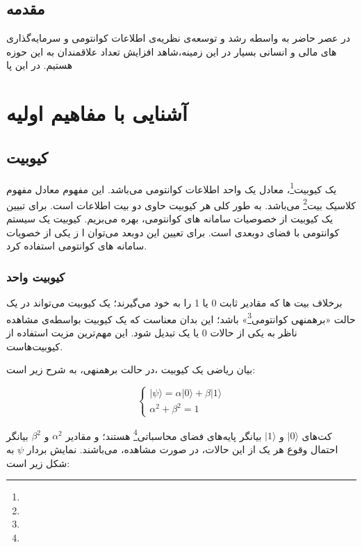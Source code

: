 \documentclass{book}
\begin{document}
\tableofcontents
\newpage
\section*{مقدمه}	
در عصر حاضر به‌ واسطه رشد و توسعه‌ی نظریه‌ی اطلاعات کوانتومی و سرمایه‌گذاری های مالی و انسانی بسیار در این زمینه،‌شاهد افزایش تعداد علاقمندان به این حوزه هستیم. در این پا\pagebreak
\chapter{آشنایی با مفاهیم اولیه}
\section{کیوبیت}

یک کیوبیت\footnote{}، معادل یک واحد اطلاعات کوانتومی می‌باشد. این مفهوم معادل مفهوم کلاسیک بیت\footnote{} می‌باشد. به طور کلی هر کیوبیت حاوی دو بیت اطلاعات است. برای تبیین یک کیوبیت از خصوصیات سامانه های کوانتومی، بهره‌ می‌بریم. کیوبیت یک سیستم کوانتومی با فضای دوبعدی است. برای تعیین این دوبعد می‌توان ا ز یکی از خصویات سامانه های کوانتومی استفاده کرد. 
\subsection{کیوبیت‌ واحد}
برخلاف بیت ها که مقادیر ثابت 0 یا 1 را به خود می‌گیرند؛ یک کیوبیت می‌تواند در یک حالت «برهمنهی کوانتومی\footnote{}» باشد؛ این بدان معناست که یک کیوبیت بواسطه‌ی مشاهده ناظر به یکی از حالات 0 یا یک تبدیل شود. این مهم‌ترین مزیت استفاده از کیوبیت‌هاست. 

\pagebreak

بیان ریاضی یک کیوبیت ،در حالت برهمنهی، به شرح زیر است:
\vspace{0.5cm}

\begin{equation}\label{psi ket}
	\left\{
	\begin{array}{ll}
		\vert \psi \rangle = \alpha\vert 0 \rangle + \beta\vert 1 \rangle \\
		\alpha^2 + \beta^2 = 1
	\end{array}
	\right.
\end{equation}

کت‌های $\vert 0 \rangle$ و $\vert 1 \rangle$ بیانگر پایه‌های فضای محاسباتی\footnote{} هستند؛ و مقادیر $\alpha^2$ و $\beta^2$ بیانگر احتمال وقوع هر یک از این حالات، در صورت مشاهده، می‌باشند. نمایش بردار $\psi$ به شکل زیر است:
\begin{center}
\end{center}
\end{document}
